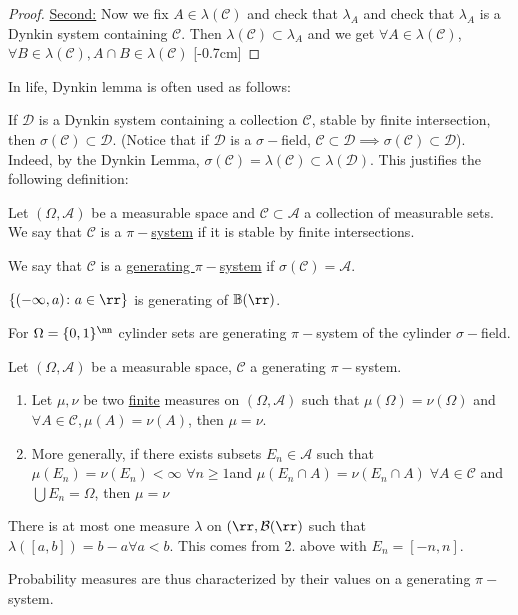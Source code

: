 \documentclass[../main.tex]{subfiles}
\begin{document}
\begin{proof}
  \vspace{0.3em}
  \underline{Second:} Now we fix $A \in \lambda(\mathcal{C})$ and check that
  $\lambda_{A}$ and check that $\lambda_A$ is a Dynkin system containing $\mathcal{C}$. Then
  $\lambda(\mathcal{C}) \subset \lambda_{A}$ and we get $\forall A \in \lambda(\mathcal{C})$,
  $\forall B \in \lambda(\mathcal{C}), A \cap B \in \lambda(\mathcal{C})$ [-0.7cm]
\end{proof}

\noindent In life, Dynkin lemma is often used as follows: 

If $\mathcal{D}$ is a Dynkin system containing a collection $\mathcal{C}$, stable by finite
intersection, then $\sigma(\mathcal{C}) \subset \mathcal{D}$. (Notice that if $\mathcal{D}$ is
a $\sigma-$field, $\mathcal{C} \subset \mathcal{D} \implies \sigma(\mathcal{C}) \subset
\mathcal{D}$).
Indeed, by the Dynkin Lemma, $\sigma(\mathcal{C}) = \lambda(\mathcal{C}) \subset
\lambda(\mathcal{D})$. This justifies the following definition:

\begin{definition}
    Let $(\Omega, \mathcal{A})$ be a measurable space and $\mathcal{C} \subset \mathcal{A}$ a
    collection of measurable sets. We say that $\mathcal{C}$ is a \underline{$\pi-$system} if
    it is stable by finite intersections.

    We say that $\mathcal{C}$ is a \underline{generating $\pi-$system} if $\sigma(\mathcal{C})
    = \mathcal{A}$. 
\end{definition}

\begin{example}
  $\{ (-\infty, a) \colon a \in \rr \} $ is generating of $\mathbb{B}(\rr)$.
\end{example}
\begin{example}
    For $\Omega = \{ 0,1 \} ^{\nn}$ cylinder sets are generating $\pi-$system of the cylinder
    $\sigma-$field.
\end{example}
\begin{corollary}
   Let $(\Omega, \mathcal{A})$ be a measurable space, $\mathcal{C}$ a generating $\pi-$system.
   \begin{enumerate}
     \item Let $\mu, \nu$ be two \underline{finite} measures on $(\Omega, \mathcal{A})$ such
       that $\mu(\Omega) = \nu(\Omega)$ and $\forall A \in \mathcal{C}, \mu(A) = \nu(A)$, then
       $\mu = \nu$.
    \item More generally, if there exists subsets $E_n \in \mathcal{A}$ such that
      $\mu(E_n) = \nu(E_n) < \infty$  $\forall n
      \geq 1$and $\mu(E_n \cap A) = \nu(E_n \cap A) \;\forall A
      \in \mathcal{C}$ and $\bigcup E_n = \Omega$, then $\mu = \nu$
   \end{enumerate}
\end{corollary}
\begin{example}
  There is at most one measure $\lambda$ on $(\rr, \mathcal{B}(\rr)$ such that $\lambda([a,b])
  = b - a \forall a < b$. This comes from 2. above with $E_n = [-n, n]$.
\end{example}
Probability measures are thus characterized by their values on a generating $\pi-$system.
\end{document}
